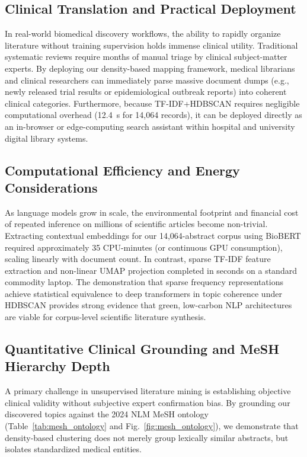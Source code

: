 \documentclass[a4paper,10pt,conference]{IEEEtran}
\begin{document}
\subsection{Clinical Translation and Practical Deployment}

In real-world biomedical discovery workflows, the ability to rapidly organize literature without training supervision holds immense clinical utility. Traditional systematic reviews require months of manual triage by clinical subject-matter experts. By deploying our density-based mapping framework, medical librarians and clinical researchers can immediately parse massive document dumps (e.g., newly released trial results or epidemiological outbreak reports) into coherent clinical categories. Furthermore, because TF-IDF+HDBSCAN requires negligible computational overhead (12.4~s for 14,064 records), it can be deployed directly as an in-browser or edge-computing search assistant within hospital and university digital library systems.

\subsection{Computational Efficiency and Energy Considerations}

As language models grow in scale, the environmental footprint and financial cost of repeated inference on millions of scientific articles become non-trivial. Extracting contextual embeddings for our 14,064-abstract corpus using BioBERT required approximately 35 CPU-minutes (or continuous GPU consumption), scaling linearly with document count. In contrast, sparse TF-IDF feature extraction and non-linear UMAP projection completed in seconds on a standard commodity laptop. The demonstration that sparse frequency representations achieve statistical equivalence to deep transformers in topic coherence under HDBSCAN provides strong evidence that green, low-carbon NLP architectures are viable for corpus-level scientific literature synthesis.

\subsection{Quantitative Clinical Grounding and MeSH Hierarchy Depth}

A primary challenge in unsupervised literature mining is establishing objective clinical validity without subjective expert confirmation bias. By grounding our discovered topics against the 2024 NLM MeSH ontology (Table~\ref{tab:mesh_ontology} and Fig.~\ref{fig:mesh_ontology}), we demonstrate that density-based clustering does not merely group lexically similar abstracts, but isolates standardized medical entities. 
\end{document}
